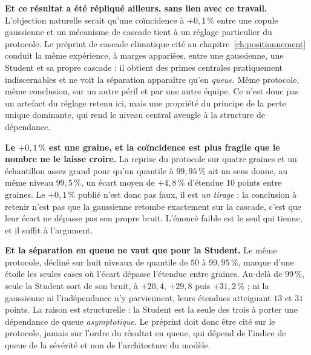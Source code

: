 \textbf{Et ce résultat a été répliqué ailleurs, sans lien avec ce travail.} L'objection naturelle
serait qu'une coïncidence à $+0{,}1\,\%$ entre une copule gaussienne et un mécanisme de cascade
tient à un réglage particulier du protocole. Le préprint de cascade climatique cité au
chapitre~\ref{ch:positionnement} \citep{ccrn2026} conduit la même expérience, à marges appariées,
entre une gaussienne, une Student et sa propre cascade : il obtient des primes centrales
pratiquement indiscernables et ne voit la séparation apparaître qu'en \emph{queue}. Même
protocole, même conclusion, sur un autre péril et par une autre équipe. Ce n'est donc pas un
artefact du réglage retenu ici, mais une propriété du principe de la perte unique dominante,
qui rend le niveau central aveugle à la structure de dépendance.

\begin{attention}
\textbf{Le $+0{,}1\,\%$ est une graine, et la coïncidence est plus fragile que le nombre ne le
laisse croire.} La reprise du protocole sur quatre graines et un échantillon assez grand pour
qu'un quantile à $99{,}95\,\%$ ait un sens donne, au même niveau
$99{,}5\,\%$, un écart moyen de $+4{,}8\,\%$ d'étendue $10$ points entre graines. Le
$+0{,}1\,\%$ publié n'est donc pas faux, il est \emph{un tirage} : la conclusion à retenir n'est
pas que la gaussienne retombe exactement sur la cascade, c'est que leur écart ne dépasse
pas son propre bruit. L'énoncé faible est le seul qui tienne, et il suffit à l'argument.

\textbf{Et la séparation en queue ne vaut que pour la Student.} Le même protocole, décliné sur
huit niveaux de quantile de $50$ à $99{,}95\,\%$, marque d'une étoile les seules cases où l'écart
dépasse l'étendue entre graines. Au-delà de $99\,\%$, seule la Student sort de son
bruit, à $+20{,}4$, $+29{,}8$ puis $+31{,}2\,\%$ ; ni la gaussienne ni l'indépendance n'y
parviennent, leurs étendues atteignant $13$ et $31$ points. La raison est structurelle : la
Student est la seule des trois à porter une dépendance de queue \emph{asymptotique}. Le préprint
doit donc être cité sur le protocole, jamais sur l'ordre du résultat en queue, qui
dépend de l'indice de queue de la sévérité et non de l'architecture du modèle.
\end{attention}

